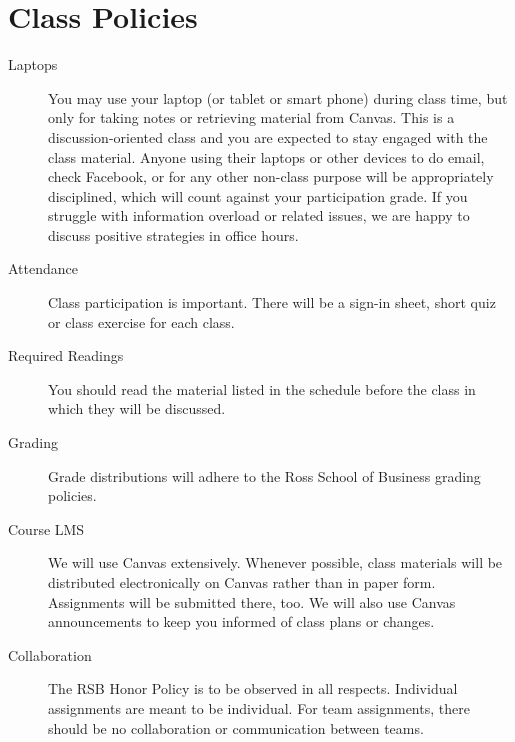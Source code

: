 \documentclass[10pt, letterpaper, twoside]{memoir}\usepackage{knitr}
\begin{document}
\section{Class Policies}

\begin{description}
\item [Laptops] You may use your laptop (or tablet or smart phone) during class time, but only for taking notes or retrieving material from Canvas. This is a discussion-oriented class and you are expected to stay engaged with the class material. Anyone using their laptops or other devices to do email, check Facebook, or for any other non-class purpose will be appropriately disciplined, which will count against your participation grade. If you struggle with information overload or related issues, we are happy to discuss positive strategies in office hours.

\item [Attendance] Class participation is important. There will be a sign-in sheet, short quiz or class exercise for each class.

\item [Required Readings] You should read the material listed in the schedule before the class in which they will be discussed.

\item [Grading] Grade distributions will adhere to the Ross School of Business grading policies.

\item [Course LMS] We will use Canvas extensively. Whenever possible, class materials will be distributed electronically on Canvas rather than in paper form. Assignments will be submitted there, too. We will also use Canvas announcements to keep you informed of class plans or changes.

\item [Collaboration] The RSB Honor Policy is to be observed in all respects. Individual assignments are meant to be individual. For team assignments, there should be no collaboration or communication between teams.


\end{description}
\end{document}
